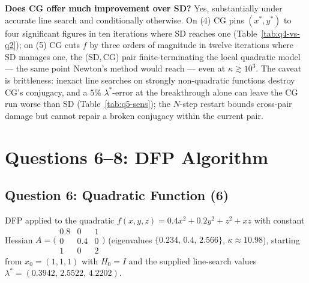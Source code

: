 \documentclass[11pt,a4paper]{article}
\begin{document}
\textbf{Does CG offer much improvement over SD?}
Yes, substantially under accurate line search and conditionally otherwise. On (4) CG pins \((x^{*},y^{*})\) to four significant figures in ten iterations where SD reaches one (Table~\ref{tab:q4-vs-q2}); on (5) CG cuts \(f\) by three orders of magnitude in twelve iterations where SD manages one, the (SD,\,CG) pair finite-terminating the local quadratic model --- the same point Newton's method would reach --- even at \(\kappa\gtrsim 10^{3}\). The caveat is brittleness: inexact line searches on strongly non-quadratic functions destroy CG's conjugacy, and a \(5\%\) \(\lambda^{*}\)-error at the breakthrough alone can leave the CG run worse than SD (Table~\ref{tab:q5-sens}); the \(N\)-step restart bounds cross-pair damage but cannot repair a broken conjugacy within the current pair.

\FloatBarrier

\section*{Questions 6--8: DFP Algorithm}


\subsection*{Question 6: Quadratic Function (6)}

DFP applied to the quadratic \(f(x,y,z)=0.4x^{2}+0.2y^{2}+z^{2}+xz\) with constant Hessian
\(A=\bigl(\begin{smallmatrix}0.8 & 0 & 1\\ 0 & 0.4 & 0\\ 1 & 0 & 2\end{smallmatrix}\bigr)\)
(eigenvalues \(\{0.234,\,0.4,\,2.566\}\), \(\kappa\approx 10.98\)), starting from \(x_{0}=(1,1,1)\) with \(H_{0}=I\) and the supplied line-search values \(\lambda^{\ast}=(0.3942,\,2.5522,\,4.2202)\).
\end{document}
